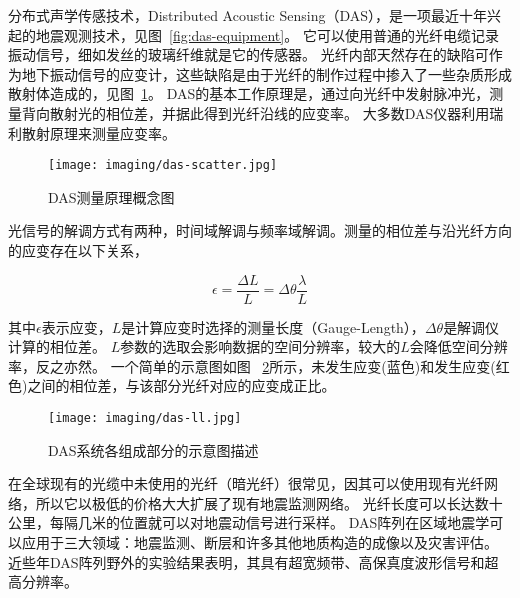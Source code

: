 分布式声学传感技术，Distributed Acoustic Sensing（DAS），是一项最近十年兴起的地震观测技术，见图~\ref{fig:das-equipment}。
它可以使用普通的光纤电缆记录振动信号，细如发丝的玻璃纤维就是它的传感器。
光纤内部天然存在的缺陷可作为地下振动信号的应变计，这些缺陷是由于光纤的制作过程中掺入了一些杂质形成散射体造成的，见图~\ref{fig:das-scatter}。
DAS的基本工作原理是，通过向光纤中发射脉冲光，测量背向散射光的相位差，并据此得到光纤沿线的应变率。
大多数DAS仪器利用瑞利散射原理来测量应变率。


\begin{figure}[h]
    \centering
    \texttt{[image: imaging/das-scatter.jpg]}
    \caption{DAS测量原理概念图}
    \label{fig:das-scatter}
\end{figure}


光信号的解调方式有两种，时间域解调与频率域解调。测量的相位差与沿光纤方向的应变存在以下关系，

\begin{equation}
    \epsilon  = \frac {\Delta L} {L} = \Delta \theta \frac {\lambda } {L}
    \label{equ:strain-phase}
\end{equation}

其中$\epsilon$表示应变，$L$是计算应变时选择的测量长度（Gauge-Length），$\Delta \theta$是解调仪计算的相位差。
$L$参数的选取会影响数据的空间分辨率，较大的$L$会降低空间分辨率，反之亦然。
一个简单的示意图如图 ~\ref{fig:das-ll}所示，未发生应变(蓝色)和发生应变(红色)之间的相位差，与该部分光纤对应的应变成正比。

\begin{figure}[h]
    \centering
    \texttt{[image: imaging/das-ll.jpg]}
    \caption{DAS系统各组成部分的示意图描述}
    \label{fig:das-ll}
\end{figure}

在全球现有的光缆中未使用的光纤（暗光纤）很常见，因其可以使用现有光纤网络，所以它以极低的价格大大扩展了现有地震监测网络。
光纤长度可以长达数十公里，每隔几米的位置就可以对地震动信号进行采样。
DAS阵列在区域地震学可以应用于三大领域：地震监测、断层和许多其他地质构造的成像以及灾害评估\citep{zhan2020distributed}。
近些年DAS阵列野外的实验结果表明，其具有超宽频带、高保真度波形信号和超高分辨率\citep{ajo2019distributed}。


